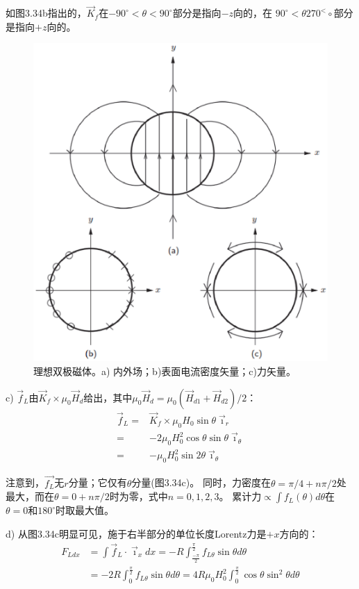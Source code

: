 如图3.34b指出的，$\vec{K}_f$在$-90^\circ<\theta<90^\circ$部分是指向$-z$向的，在
$90^\circ<\theta270^<\circ$部分是指向$+z$向的。
\begin{figure}[htbp]
	\centering
	\includegraphics[scale=0.6]{chpt3/figs/fig3.34.eps}
	\caption{理想双极磁体。a) 内外场；b)表面电流密度矢量；c)力矢量。}
\end{figure}

c) $\vec{f}_L$由$\vec{K}_f\times\mu_0 \vec{H}_d$给出，其中$\mu_0 \vec{H}_d=\mu_0(\vec{H}_{d1}+\vec{H}_{d2})/2$：
\begin{align*}
\vec{f}_{L}=&\vec{K}_{f}\times\mu_{0}H_{0}\sin\theta\vec{\imath}_{r}\tag{S8.1}\\
=&-2\mu_{0}H_{0}^{2}\cos\theta \sin\theta\vec{\imath}_{\theta}\\
=&-\mu_{0}H_{0}^{2}\sin 2\theta\vec{\imath}_{\theta}\tag{3.141}
\end{align*}

注意到，$\vec{f_L}$无$r$分量；它仅有$\theta$分量(图3.34c)。
同时，力密度在$\theta=\pi/4+n\pi/2$处最大，而在$\theta=0+n\pi/2$时为零，式中$n=0, 1, 2, 3$。
累计力$\propto\int f_L(\theta)d\theta$在$\theta=0$和$180^\circ$时取最大值。

d) 从图3.34c明显可见，施于右半部分的单位长度Lorentz力是$+x$方向的：
\begin{align*}
F_{Ldx}&=\int\vec{f}_{L}\cdot\vec{\imath}_{x}dx=-R\int_{\frac{-\pi}{2}}^{\frac{\pi}{2}}f_{L\theta}\sin\theta d\theta\tag{S8.2a}\\
&=-2R\int_{0}^{\frac{\pi}{2}}f_{L\theta}\sin\theta d\theta=4R\mu_{0}H_{0}^{2}\int_{0}^{\frac{\pi}{2}}\cos\theta \sin^{2}\theta d\theta\tag{S8.2b}
\end{align*}

